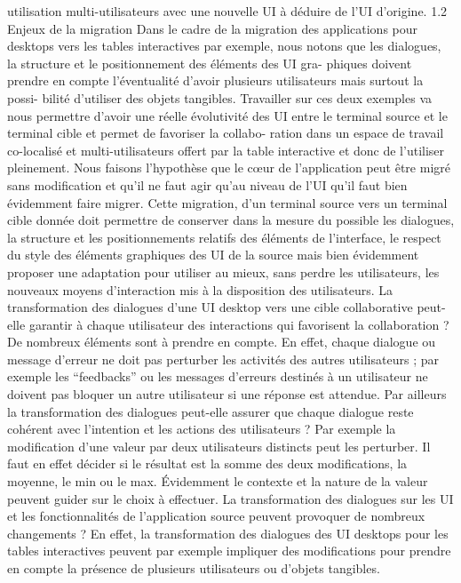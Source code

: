 \documentclass{article}
\begin{document}
utilisation multi-utilisateurs avec une nouvelle UI à déduire de l’UI d’origine.
1.2
Enjeux de la migration
Dans le cadre de la migration des applications pour desktops vers les tables interactives par
exemple, nous notons que les dialogues, la structure et le positionnement des éléments des UI gra-
phiques doivent prendre en compte l’éventualité d’avoir plusieurs utilisateurs mais surtout la possi-
bilité d’utiliser des objets tangibles. Travailler sur ces deux exemples va nous permettre d’avoir une
réelle évolutivité des UI entre le terminal source et le terminal cible et permet de favoriser la collabo-
ration dans un espace de travail co-localisé et multi-utilisateurs offert par la table interactive et donc
de l’utiliser pleinement.
Nous faisons l’hypothèse que le cœur de l’application peut être migré sans modiﬁcation et qu’il ne
faut agir qu’au niveau de l’UI qu’il faut bien évidemment faire migrer. Cette migration, d’un terminal
source vers un terminal cible donnée doit permettre de conserver dans la mesure du possible les
dialogues, la structure et les positionnements relatifs des éléments de l’interface, le respect du style
des éléments graphiques des UI de la source mais bien évidemment proposer une adaptation pour
utiliser au mieux, sans perdre les utilisateurs, les nouveaux moyens d’interaction mis à la disposition
des utilisateurs.
La transformation des dialogues d’une UI desktop vers une cible collaborative peut-elle garantir
à chaque utilisateur des interactions qui favorisent la collaboration ? De nombreux éléments sont à
prendre en compte. En effet, chaque dialogue ou message d’erreur ne doit pas perturber les activités
des autres utilisateurs ; par exemple les “feedbacks” ou les messages d’erreurs destinés à un utilisateur
ne doivent pas bloquer un autre utilisateur si une réponse est attendue. Par ailleurs la transformation
des dialogues peut-elle assurer que chaque dialogue reste cohérent avec l’intention et les actions des
utilisateurs ? Par exemple la modiﬁcation d’une valeur par deux utilisateurs distincts peut les perturber.
Il faut en effet décider si le résultat est la somme des deux modiﬁcations, la moyenne, le min ou le
max. Évidemment le contexte et la nature de la valeur peuvent guider sur le choix à effectuer.
La transformation des dialogues sur les UI et les fonctionnalités de l’application source peuvent
provoquer de nombreux changements ? En effet, la transformation des dialogues des UI desktops
pour les tables interactives peuvent par exemple impliquer des modiﬁcations pour prendre en compte
la présence de plusieurs utilisateurs ou d’objets tangibles.
\end{document}

